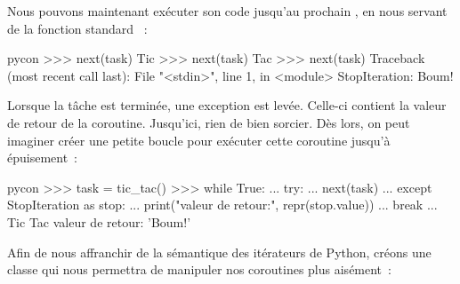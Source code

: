 \documentclass[small]{zmdocument}
\begin{document}
Nous pouvons maintenant exécuter son code jusqu’au prochain , en nous
servant de la fonction standard  :



\begin{CodeBlock}{pycon}
>>> next(task)
Tic
>>> next(task)
Tac
>>> next(task)
Traceback (most recent call last):
  File "<stdin>", line 1, in <module>
StopIteration: Boum!
\end{CodeBlock}



Lorsque la tâche est terminée, une exception  est levée.
Celle-ci contient la valeur de retour de la coroutine. Jusqu’ici, rien de bien
sorcier. Dès lors, on peut imaginer créer une petite boucle pour exécuter cette
coroutine jusqu’à épuisement :



\begin{CodeBlock}{pycon}
>>> task = tic_tac()
>>> while True:
...     try:
...         next(task)
...     except StopIteration as stop:
...         print("valeur de retour:", repr(stop.value))
...         break
...
Tic
Tac
valeur de retour: 'Boum!'
\end{CodeBlock}



Afin de nous affranchir de la sémantique des itérateurs de Python, créons une
classe  qui nous permettra de manipuler nos coroutines plus aisément :
\end{document}
